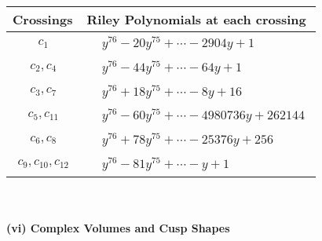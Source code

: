 \documentclass[1p]{elsarticle_modified}
\theoremstyle{definition}
\begin{document}
\begin{tabular}{m{50pt}|m{274pt}}
Crossings & \hspace{64pt}Riley Polynomials at each crossing \\
\hline $$\begin{aligned}c_{1}\end{aligned}$$&$\begin{aligned}
&y^{76}-20 y^{75}+\cdots-2904 y+1
\end{aligned}$\\
\hline $$\begin{aligned}c_{2},c_{4}\end{aligned}$$&$\begin{aligned}
&y^{76}-44 y^{75}+\cdots-64 y+1
\end{aligned}$\\
\hline $$\begin{aligned}c_{3},c_{7}\end{aligned}$$&$\begin{aligned}
&y^{76}+18 y^{75}+\cdots-8 y+16
\end{aligned}$\\
\hline $$\begin{aligned}c_{5},c_{11}\end{aligned}$$&$\begin{aligned}
&y^{76}-60 y^{75}+\cdots-4980736 y+262144
\end{aligned}$\\
\hline $$\begin{aligned}c_{6},c_{8}\end{aligned}$$&$\begin{aligned}
&y^{76}+78 y^{75}+\cdots-25376 y+256
\end{aligned}$\\
\hline $$\begin{aligned}c_{9},c_{10},c_{12}\end{aligned}$$&$\begin{aligned}
&y^{76}-81 y^{75}+\cdots- y+1
\end{aligned}$\\
\hline
\end{tabular}\\~\\
\newpage\flushleft \textbf{(vi) Complex Volumes and Cusp Shapes}
\end{document}
